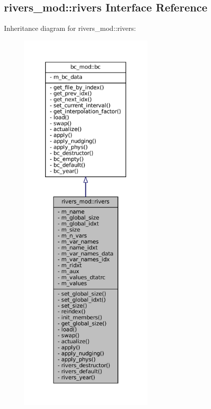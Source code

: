 \hypertarget{structrivers__mod_1_1rivers}{}\subsection{rivers\+\_\+mod\+:\+:rivers Interface Reference}
\label{structrivers__mod_1_1rivers}


Inheritance diagram for rivers\+\_\+mod\+:\+:rivers\+:
\nopagebreak
\begin{figure}[H]
\begin{center}
\leavevmode
\includegraphics[height=550pt]{structrivers__mod_1_1rivers__inherit__graph}
\end{center}
\end{figure}
